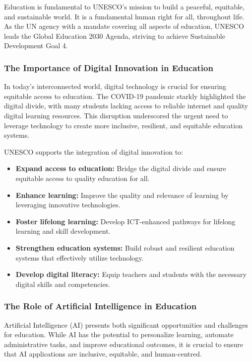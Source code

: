 \documentclass[a4paper,11pt]{article}
\begin{document}
Education is fundamental to UNESCO's mission to build a peaceful, equitable, and sustainable world. It is a fundamental human right for all, throughout life. As the UN agency with a mandate covering all aspects of education, UNESCO leads the Global Education 2030 Agenda, striving to achieve Sustainable Development Goal 4.
\cite{unesco-education-transforms-lives}

\subsubsection{The Importance of Digital Innovation in Education}

In today's interconnected world, digital technology is crucial for ensuring equitable access to education. The COVID-19 pandemic starkly highlighted the digital divide, with many students lacking access to reliable internet and quality digital learning resources. This disruption underscored the urgent need to leverage technology to create more inclusive, resilient, and equitable education systems.

UNESCO supports the integration of digital innovation to:
\begin{itemize}
	\item \textbf{Expand access to education:} Bridge the digital divide and ensure equitable access to quality education for all.
	\item \textbf{Enhance learning:} Improve the quality and relevance of learning by leveraging innovative technologies.
	\item \textbf{Foster lifelong learning:} Develop ICT-enhanced pathways for lifelong learning and skill development.
	\item \textbf{Strengthen education systems:} Build robust and resilient education systems that effectively utilize technology.
	\item \textbf{Develop digital literacy:} Equip teachers and students with the necessary digital skills and competencies.
\end{itemize}

\subsubsection{The Role of Artificial Intelligence in Education}

Artificial Intelligence (AI) presents both significant opportunities and challenges for education. While AI has the potential to personalize learning, automate administrative tasks, and improve educational outcomes, it is crucial to ensure that AI applications are inclusive, equitable, and human-centred.
\end{document}
